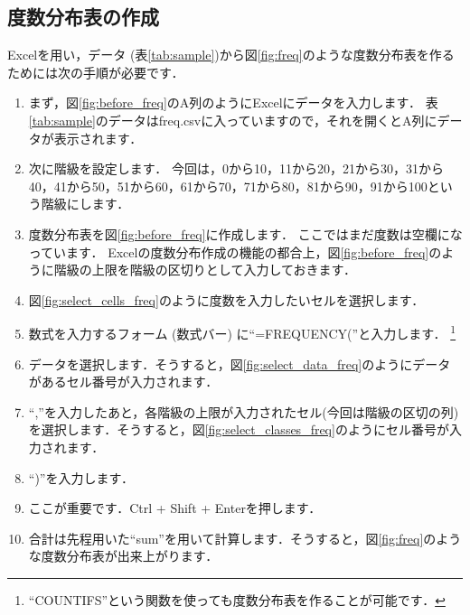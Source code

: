 \subsection{度数分布表の作成}
\label{sec:make_freq}

Excelを用い，データ (表\ref{tab:sample})から図\ref{fig:freq}のような度数分布表を作るためには次の手順が必要です．

\begin{enumerate}
    \item まず，図\ref{fig:before_freq}のA列のようにExcelにデータを入力します．
    表\ref{tab:sample}のデータはfreq.csvに入っていますので，それを開くとA列にデータが表示されます．
    \item 次に階級を設定します．
    今回は，0から10，11から20，21から30，31から40，41から50，51から60，61から70，71から80，81から90，91から100という階級にします．
    \item 度数分布表を図\ref{fig:before_freq}に作成します．
    ここではまだ度数は空欄になっています．
    Excelの度数分布作成の機能の都合上，図\ref{fig:before_freq}のように階級の上限を階級の区切りとして入力しておきます．
    \item 図\ref{fig:select_cells_freq}のように度数を入力したいセルを選択します．
    \item 数式を入力するフォーム (数式バー) に``=FREQUENCY(''と入力します．
    \footnote{``COUNTIFS''という関数を使っても度数分布表を作ることが可能です．}
    \item データを選択します．そうすると，図\ref{fig:select_data_freq}のようにデータがあるセル番号が入力されます．
    \item ``,''を入力したあと，各階級の上限が入力されたセル(今回は階級の区切の列)を選択します．そうすると，図\ref{fig:select_classes_freq}のようにセル番号が入力されます．
    \item ``)''を入力します．
    \item ここが重要です．Ctrl + Shift + Enterを押します．
    \item 合計は先程用いた``sum''を用いて計算します．そうすると，図\ref{fig:freq}のような度数分布表が出来上がります．
\end{enumerate}


